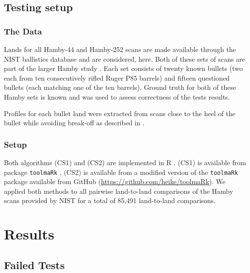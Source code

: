 \documentclass[12pt]{article}
\begin{document}
\subsection{Testing setup}\label{testing-setup}

\subsubsection{The Data}\label{the-data}

Lands for all Hamby-44 and Hamby-252 scans are made available through
the NIST ballistics database \citep{nist} and are considered, here. Both
of these sets of scans are part of the larger Hamby study \citep{hamby}.
Each set consists of twenty known bullets (two each from ten
consecutively rifled Ruger P85 barrels) and fifteen questioned bullets
(each matching one of the ten barrels). Ground truth for both of these
Hamby sets is known and was used to assess correctness of the tests
results.

Profiles for each bullet land were extracted from scans close to the
heel of the bullet while avoiding break-off as described in
\citet{aoas}.

\subsubsection{Setup}\label{setup}

Both algorithms (CS1) and (CS2) are implemented in R \citep{R}. (CS1) is
available from package \texttt{toolmaRk} \citep{toolmark}, (CS2) is
available from a modified version of the \texttt{toolmaRk} package
available from GitHub (\url{https://github.com/heike/toolmaRk}). We
applied both methods to all pairwise land-to-land comparisons of the
Hamby scans provided by NIST for a total of 85,491 land-to-land
comparisons.

\section{Results}\label{results}

\subsection{Failed Tests}\label{failed-tests}
\end{document}
